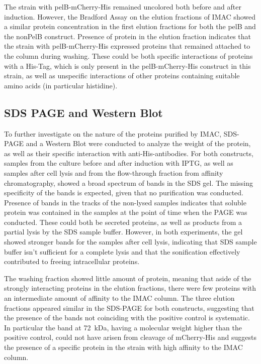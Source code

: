 \documentclass[a4paper,12pt]{article}
\begin{document}
The strain with pelB-mCherry-His remained uncolored both before and after induction. However, the Bradford Assay on the elution fractions of IMAC showed a similar protein concentration in the first elution fractions for both the pelB and  the nonPelB construct. Presence of protein in the elution fraction indicates that the strain with pelB-mCherry-His expressed proteins that remained attached to the column during washing. These could be both specific interactions of proteins with a His-Tag, which is only present in the pelB-mCherry-His construct in this strain, as well as unspecific interactions of other proteins containing suitable amino acids (in particular histidine).

\subsection{SDS PAGE and Western Blot}
To further investigate on the nature of the proteins purified by IMAC, SDS-PAGE and a Western Blot were conducted to analyze the weight of the protein, as well as their specific interaction with anti-His-antibodies. For both constructs, samples from the culture before and after induction with IPTG, as well as samples after cell lysis and from the flow-through fraction from affinity chromatography, showed a broad spectrum of bands in the SDS gel. The missing specificity of the bands is expected, given that no purification was conducted. Presence of bands in the tracks of the non-lysed samples indicates that soluble protein was contained in the samples at the point of time when the PAGE was conducted. These could both be secreted proteins, as well as products from a partial lysis by the SDS sample buffer. However, in both experiments, the gel showed stronger bands for the samples after cell lysis, indicating that SDS sample buffer isn't sufficient for a complete lysis and that the sonification effectively contributed to freeing intracellular proteins. 

The washing fraction showed little amount of protein, meaning that aside of the strongly interacting proteins in the elution fractions, there were few proteins with an intermediate amount of affinity to the IMAC column. The three elution fractions appeared similar in the SDS-PAGE for both constructs, suggesting that the presence of the bands not coinciding with the positive control is systematic. In particular the band at 72~kDa, having a molecular weight higher than the positive control, could not have arisen from cleavage of mCherry-His and suggests the presence of a specific protein in the strain with high affinity to the IMAC column.
\end{document}
